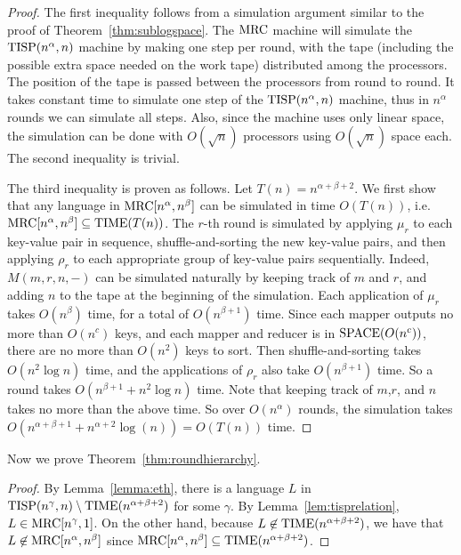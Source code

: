 \documentclass[letterpaper,USenglish]{lipics}
\theoremstyle{definition}
\theoremstyle{remark}
\newcommand{\mrc}{\textup{MRC}}
\newcommand{\SPACE}{\textup{SPACE}}
\newcommand{\TIME}{\textup{TIME}}
\newcommand{\TISP}{\textup{TISP}}
\begin{document}
\begin{proof} The first inequality follows from a simulation argument similar
to the proof of Theorem~\ref{thm:sublogspace}. The $\mrc$ machine will simulate
the $\TISP(n^\alpha,n)$ machine by making one step per round, with the tape
(including the possible extra space needed on the work tape) distributed among
the processors.  The position of the tape is passed between the processors from
round to round.  It takes constant time to simulate one step of the
$\TISP(n^\alpha,n)$ machine, thus in $n^\alpha$ rounds we can simulate all
steps.  Also, since the machine uses only linear space, the simulation can be
done with $O(\sqrt{n})$ processors using $O(\sqrt{n})$ space each.  The second
inequality is trivial.

The third inequality is proven as follows. Let $T(n) = n^{\alpha+\beta+2}$.
We first show that any language in $\mrc[n^\alpha,n^\beta]$ can be simulated in
time $O(T(n))$, i.e. $\mrc[n^\alpha,n^\beta] \subseteq \TIME(T(n))$. The $r$-th
round is simulated by applying $\mu_r$ to each key-value pair in sequence,
shuffle-and-sorting the new key-value pairs, and then applying $\rho_r$ to each
appropriate group of key-value pairs sequentially. Indeed, $M(m,r,n,-)$ can be
simulated naturally by keeping track of $m$ and $r$, and adding $n$ to the tape
at the beginning of the simulation. Each application of $\mu_r$ takes
$O(n^\beta)$ time, for a total of $O(n^{\beta+1})$ time. Since each mapper
outputs no more than $O(n^c)$ keys, and each mapper and reducer is in
$\SPACE(O(n^c))$, there are no more than $O(n^2)$ keys to sort. Then
shuffle-and-sorting takes $O(n^2 \log n)$ time, and the applications of
$\rho_r$ also take $O(n^{\beta+1})$ time. So a round takes $O(n^{\beta+1} +
n^2 \log n)$ time. Note that keeping track of $m$,$r$, and $n$ takes no more
than the above time. So over $O(n^\alpha)$ rounds, the simulation takes
$O(n^{\alpha+\beta+1}+n^{\alpha+2} \log(n))=O(T(n))$ time. \end{proof}

Now we prove Theorem~\ref{thm:roundhierarchy}.

\begin{proof}
By Lemma~\ref{lemma:eth}, there is a language $L$ in $\TISP(n^\gamma,
n)\setminus \TIME(n^{\alpha+\beta+2})$ for some $\gamma$. By
Lemma~\ref{lem:tisprelation}, $L\in \mrc[n^\gamma, 1]$. On the other hand,
because $L\not\in  \TIME(n^{\alpha+\beta+2})$, we have that $L\not\in
\mrc[n^\alpha, n^\beta]$ since $\mrc[n^\alpha, n^\beta]\subseteq
\TIME(n^{\alpha+\beta+2})$.
\end{proof}
\end{document}
